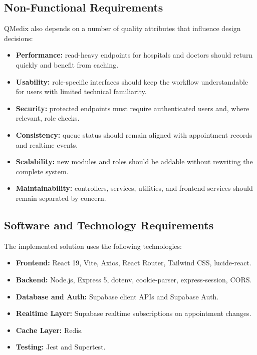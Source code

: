 \documentclass[12pt,onecolumn]{IEEEtran}
\begin{document}
\subsection{Non-Functional Requirements}
QMedix also depends on a number of quality attributes that influence design decisions:
\begin{itemize}
    \item \textbf{Performance:} read-heavy endpoints for hospitals and doctors should return quickly and benefit from caching.
    \item \textbf{Usability:} role-specific interfaces should keep the workflow understandable for users with limited technical familiarity.
    \item \textbf{Security:} protected endpoints must require authenticated users and, where relevant, role checks.
    \item \textbf{Consistency:} queue status should remain aligned with appointment records and realtime events.
    \item \textbf{Scalability:} new modules and roles should be addable without rewriting the complete system.
    \item \textbf{Maintainability:} controllers, services, utilities, and frontend services should remain separated by concern.
\end{itemize}

\subsection{Software and Technology Requirements}
The implemented solution uses the following technologies:
\begin{itemize}
    \item \textbf{Frontend:} React 19, Vite, Axios, React Router, Tailwind CSS, lucide-react.
    \item \textbf{Backend:} Node.js, Express 5, dotenv, cookie-parser, express-session, CORS.
    \item \textbf{Database and Auth:} Supabase client APIs and Supabase Auth.
    \item \textbf{Realtime Layer:} Supabase realtime subscriptions on appointment changes.
    \item \textbf{Cache Layer:} Redis.
    \item \textbf{Testing:} Jest and Supertest.
\end{itemize}
\end{document}
